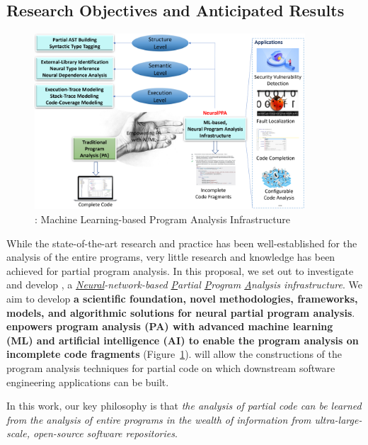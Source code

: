 \subsection{Research Objectives and Anticipated Results}

\begin{figure}[t]
    \centering
    \includegraphics[width=0.9\textwidth]{graphs/neuralppa}
    \vspace{-12pt}
    \caption{{\tool}: Machine Learning-based Program Analysis Infrastructure}
    \label{fig:arch}
\end{figure}


While the state-of-the-art research and practice has been
well-established for the analysis of the entire programs, very little
research and knowledge has been achieved for partial program
analysis.
%
In this proposal, we set out to investigate and develop {\tool}, a
{\em \underline{Neural}-network-based \underline{P}artial
  \underline{P}rogram \underline{A}nalysis infrastructure}. We aim to
develop {\bf a scientific foundation, novel methodologies, frameworks,
  models, and algorithmic solutions for neural partial program
  analysis}. {\tool} {\bf enpowers program analysis (PA) with advanced
machine learning (ML) and artificial intelligence (AI) to enable the
program analysis on incomplete code fragments} (Figure~\ref{fig:arch}).
{\tool} will allow the constructions of the program analysis
techniques for partial code on which downstream software
engineering applications can be built.


In this work, our key philosophy is that {\em the analysis of
  partial code can be learned from the analysis of entire programs in
  the wealth of information from ultra-large-scale, open-source
  software repositories}.



